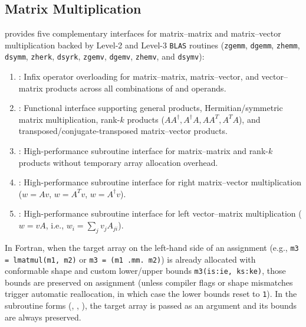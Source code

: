 \subsection{Matrix Multiplication}
\label{subsec:matrix_multiplication}

 provides five complementary interfaces for matrix--matrix and matrix--vector multiplication backed by Level-2 and Level-3 \texttt{BLAS} routines (\texttt{zgemm}, \texttt{dgemm}, \texttt{zhemm}, \texttt{dsymm}, \texttt{zherk}, \texttt{dsyrk}, \texttt{zgemv}, \texttt{dgemv}, \texttt{zhemv}, and \texttt{dsymv}):
\begin{enumerate}
  \item {}: Infix operator overloading for matrix--matrix, matrix--vector, and vector--matrix products across all combinations of  and  operands.
  \item {}: Functional interface supporting general products, Hermitian/symmetric matrix multiplication, rank-$k$ products ($A A^\dagger, A^\dagger A, A A^T, A^T A$), and transposed/conjugate-transposed matrix--vector products.
  \item {}: High-performance subroutine interface for matrix--matrix and rank-$k$ products without temporary array allocation overhead.
  \item {}: High-performance subroutine interface for right matrix--vector multiplication ($w = A v$, $w = A^T v$, $w = A^\dagger v$).
  \item {}: High-performance subroutine interface for left vector--matrix multiplication ($w = v A$, i.e., $w_i = \sum_j v_j A_{ji}$).
\end{enumerate}

\begin{notebox}
In Fortran, when the target array on the left-hand side of an assignment (e.g., \texttt{m3 = lmatmul(m1, m2)} or \texttt{m3 = (m1 .mm. m2)}) is already allocated with conformable shape and custom lower/upper bounds \texttt{m3(is:ie, ks:ke)}, those bounds are preserved on assignment (unless compiler flags or shape mismatches trigger automatic reallocation, in which case the lower bounds reset to \texttt{1}). In the subroutine forms (, , ), the target array is passed as an  argument and its bounds are always preserved.
\end{notebox}


